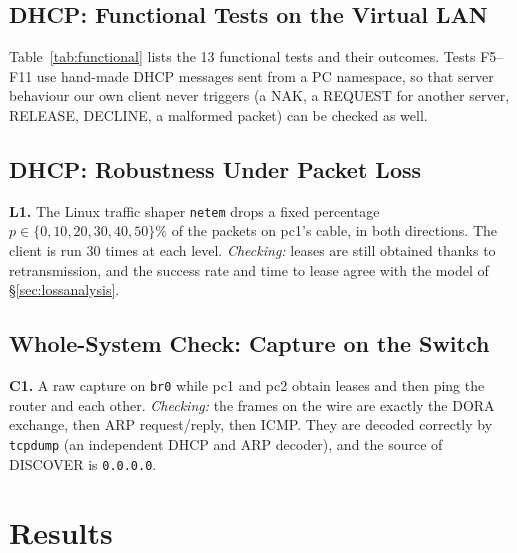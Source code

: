 \documentclass[11pt]{article}
\begin{document}
\subsection{DHCP: Functional Tests on the Virtual LAN}
Table~\ref{tab:functional} lists the 13 functional tests and their outcomes. Tests F5--F11
use hand-made DHCP messages sent from a PC namespace, so that server behaviour our own
client never triggers (a NAK, a REQUEST for another server, RELEASE, DECLINE, a malformed
packet) can be checked as well.

\subsection{DHCP: Robustness Under Packet Loss}
\textbf{L1.} The Linux traffic shaper \texttt{netem} drops a fixed percentage
$p\in\{0,10,20,30,40,50\}\%$ of the packets on pc1's cable, in both directions. The client
is run 30 times at each level. \emph{Checking:} leases are still obtained thanks to
retransmission, and the success rate and time to lease agree with the model of
\S\ref{sec:lossanalysis}.

\subsection{Whole-System Check: Capture on the Switch}
\textbf{C1.} A raw capture on \texttt{br0} while pc1 and pc2 obtain leases and then ping
the router and each other. \emph{Checking:} the frames on the wire are exactly the
DORA exchange, then ARP request/reply, then ICMP. They are decoded correctly by
\texttt{tcpdump} (an independent DHCP and ARP decoder), and the source of DISCOVER is
\texttt{0.0.0.0}.

\section{Results}
\label{sec:results}
\end{document}
